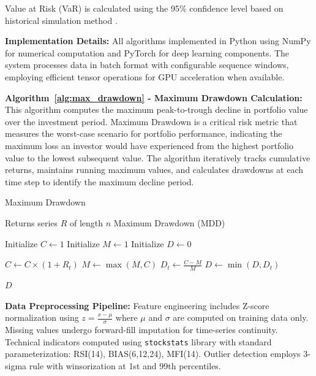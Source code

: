 \documentclass[3p,times,procedia]{elsarticle}
\begin{document}
Value at Risk (VaR) is calculated using the 95\% confidence level based on historical simulation method \cite{Jorion2001}.

\textbf{Implementation Details:} All algorithms implemented in Python using NumPy for numerical computation and PyTorch for deep learning components. The system processes data in batch format with configurable sequence windows, employing efficient tensor operations for GPU acceleration when available.

\textbf{Algorithm~\ref{alg:max_drawdown} - Maximum Drawdown Calculation:} This algorithm computes the maximum peak-to-trough decline in portfolio value over the investment period. Maximum Drawdown is a critical risk metric that measures the worst-case scenario for portfolio performance, indicating the maximum loss an investor would have experienced from the highest portfolio value to the lowest subsequent value. The algorithm iteratively tracks cumulative returns, maintains running maximum values, and calculates drawdowns at each time step to identify the maximum decline period.

\begin{algorithm}[H]
\caption{Maximum Drawdown}
\label{alg:max_drawdown}
\begin{algorithmic}[1]
    \Require Returns series \( R \) of length \( n \)
    \Ensure Maximum Drawdown (MDD)
    
    \State Initialize \( C \gets 1 \) 
    \State Initialize \( M \gets 1 \) 
    \State Initialize \( D \gets 0 \) 

        \State \( C \gets C \times (1 + R_t) \) 
        \State \( M \gets \max(M, C) \) 
        \State \( D_t \gets \frac{C - M}{M} \) 
        \State \( D \gets \min(D, D_t) \) 
    \EndFor

    \State \Return \( D \)
\end{algorithmic}
\end{algorithm}

\textbf{Data Preprocessing Pipeline:} Feature engineering includes Z-score normalization using $z = \frac{x - \mu}{\sigma}$ where $\mu$ and $\sigma$ are computed on training data only. Missing values undergo forward-fill imputation for time-series continuity. Technical indicators computed using \texttt{stockstats} library with standard parameterization: RSI(14), BIAS(6,12,24), MFI(14). Outlier detection employs 3-sigma rule with winsorization at 1st and 99th percentiles.
\end{document}
